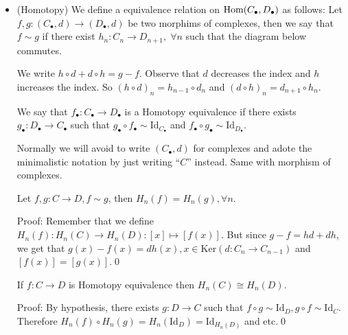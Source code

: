 \begin{itemize}
    \item(Homotopy)
    We define a equivalence relation on $\text{Hom} (C_\bullet, D_\bullet)$ as follows: 
    Let $f,g: (C_\bullet,d)\to (D_\bullet,d)$ be two morphims of complexes, then we say that $f\sim g$ 
    if there exist $h_n:C_n\to D_{n+1},\;\forall n$ such that the diagram below commutes.
    \begin{center}
    \end{center}
    We write  $h\circ d+d\circ h = g-f$. Observe that $d$ decreases the index and $h$ increases the index. So 
    $(h\circ d)_n = h_{n-1}\circ d_n$ and $(d\circ h)_n = d_{n+1}\circ h_n$. 
    \begin{definition}
        We say that $f_\bullet:C_\bullet\to D_\bullet$ is a Homotopy equivalence if there exists 
        $g_\bullet:D_\bullet\to C_\bullet$ such that $g_\bullet\circ f_\bullet \sim \text{Id}_{C_\bullet}$ and 
        $f_\bullet\circ g_\bullet\sim \text{Id}_{D_\bullet}$.
    \end{definition}
    \begin{notation}
    Normally we will avoid to write $(C_\bullet,d)$ for complexes and adote the minimalistic notation by just writing 
    ``$C$'' instead. Same with morphism of complexes.
    \end{notation}
    \begin{proposition}
        Let $f,g:C\to D, f\sim g$, then $H_n(f)=H_n(g),\forall n$. 
    \end{proposition}
    Proof: Remember that we define $H_n(f): H_n(C)\to H_n(D):[x]\mapsto [f(x)]$. But since $g-f = hd+dh$, we get that 
    $g(x)-f(x)=dh(x), x \in \text{Ker}(d: C_n \to C_{n-1})$ and $[f(x)]=[g(x)]$.\qed
    \begin{corollary}
        If $f:C\to D$ is Homotopy equivalence then $H_n(C)\cong H_n(D)$.
    \end{corollary}
    Proof: By hypothesis, there exists $g:D\to C$ such that $f \circ g\sim\text{Id}_D,g\circ f\sim\text{Id}_C$. Therefore 
    $H_n(f)\circ H_n(g) = H_n(\text{Id}_D)=\text{Id}_{H_n(D)}$ and etc.\qed 
    

\end{itemize}
